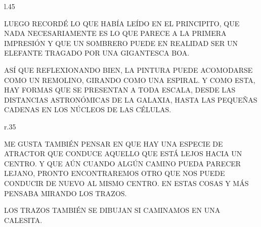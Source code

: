 \begin{wrapfigure} [9]{l}{.45\textwidth}\vspace{-1.2cm}%
\end{wrapfigure}

LUEGO RECORDÉ LO QUE HABÍA LEÍDO EN EL PRINCIPITO, QUE NADA NECESARIAMENTE ES LO QUE PARECE A LA PRIMERA IMPRESIÓN Y QUE UN SOMBRERO PUEDE EN REALIDAD SER UN ELEFANTE TRAGADO POR UNA GIGANTESCA BOA.
\newpage
{}
ASÍ QUE REFLEXIONANDO BIEN, LA PINTURA PUEDE ACOMODARSE COMO UN REMOLINO, GIRANDO COMO UNA ESPIRAL. Y COMO ESTA, HAY FORMAS QUE SE PRESENTAN A TODA ESCALA, DESDE LAS DISTANCIAS ASTRONÓMICAS DE LA GALAXIA, HASTA LAS PEQUEÑAS CADENAS EN LOS NÚCLEOS DE LAS CÉLULAS.

\begin{wrapfigure}[8]{r}{.35\textwidth}
	\vspace{-1.8cm}
	\hspace{-2.6cm}
%
\end{wrapfigure}

ME GUSTA TAMBIÉN PENSAR EN QUE HAY UNA ESPECIE DE ATRACTOR QUE CONDUCE AQUELLO QUE ESTÁ LEJOS HACIA UN CENTRO. Y QUE AÚN CUANDO ALGÚN CAMINO PUEDA PARECER LEJANO, PRONTO ENCONTRAREMOS OTRO QUE NOS PUEDE CONDUCIR DE NUEVO AL MISMO CENTRO. EN ESTAS COSAS Y MÁS PENSABA MIRANDO LOS TRAZOS.

\newpage
{}
LOS TRAZOS TAMBIÉN SE DIBUJAN SI CAMINAMOS EN UNA CALESITA. 

